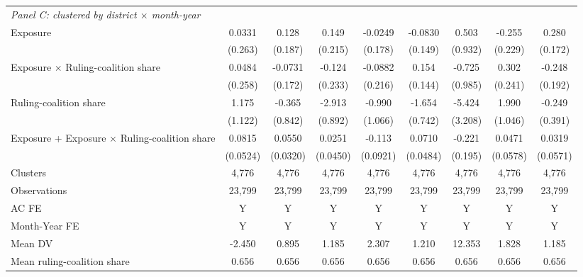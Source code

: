{\begin{tabular}{l*{8}{c}}
\multicolumn{9}{l}{\textit{Panel C: clustered by district $\times$ month-year}} \\
Exposure    &      0.0331         &       0.128         &       0.149         &     -0.0249         &     -0.0830         &       0.503         &      -0.255         &       0.280         \\
            &     (0.263)         &     (0.187)         &     (0.215)         &     (0.178)         &     (0.149)         &     (0.932)         &     (0.229)         &     (0.172)         \\
Exposure $\times$ Ruling-coalition share&      0.0484         &     -0.0731         &      -0.124         &     -0.0882         &       0.154         &      -0.725         &       0.302         &      -0.248         \\
            &     (0.258)         &     (0.172)         &     (0.233)         &     (0.216)         &     (0.144)         &     (0.985)         &     (0.241)         &     (0.192)         \\
Ruling-coalition share&       1.175         &      -0.365         &      -2.913\sym{***}&      -0.990         &      -1.654\sym{**} &      -5.424\sym{*}  &       1.990\sym{*}  &      -0.249         \\
            &     (1.122)         &     (0.842)         &     (0.892)         &     (1.066)         &     (0.742)         &     (3.208)         &     (1.046)         &     (0.391)         \\

Exposure + Exposure $\times$ Ruling-coalition share&      0.0815         &0.0550\sym{*}         &      0.0251         &      -0.113         &      0.0710         &      -0.221         &      0.0471         &      0.0319         \\
            &    (0.0524)         &    (0.0320)         &    (0.0450)         &    (0.0921)         &    (0.0484)         &     (0.195)         &    (0.0578)         &    (0.0571)         \\
Clusters    &       4,776         &       4,776         &       4,776         &       4,776         &       4,776         &       4,776         &       4,776         &       4,776         \\
\midrule



Observations&      23,799&      23,799&      23,799&      23,799&      23,799&      23,799&      23,799&      23,799\\
AC FE       &           Y&           Y&           Y&           Y&           Y&           Y&           Y&           Y\\
Month-Year FE&           Y&           Y&           Y&           Y&           Y&           Y&           Y&           Y\\
Mean DV     &      -2.450&       0.895&       1.185&       2.307&       1.210&      12.353&       1.828&       1.185\\
Mean ruling-coalition share&       0.656&       0.656&       0.656&       0.656&       0.656&       0.656&       0.656&       0.656\\
\bottomrule
\end{tabular}
}
